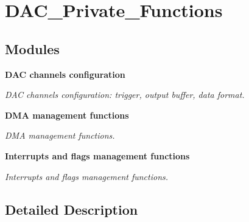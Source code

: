 \section{D\+A\+C\+\_\+\+Private\+\_\+\+Functions}
\label{group__DAC__Private__Functions}
\subsection*{Modules}
\begin{DoxyCompactItemize}
\item 
\textbf{ D\+A\+C channels configuration}
\begin{DoxyCompactList}\small\item\em D\+AC channels configuration\+: trigger, output buffer, data format. \end{DoxyCompactList}\item 
\textbf{ D\+M\+A management functions}
\begin{DoxyCompactList}\small\item\em D\+MA management functions. \end{DoxyCompactList}\item 
\textbf{ Interrupts and flags management functions}
\begin{DoxyCompactList}\small\item\em Interrupts and flags management functions. \end{DoxyCompactList}\end{DoxyCompactItemize}


\subsection{Detailed Description}
